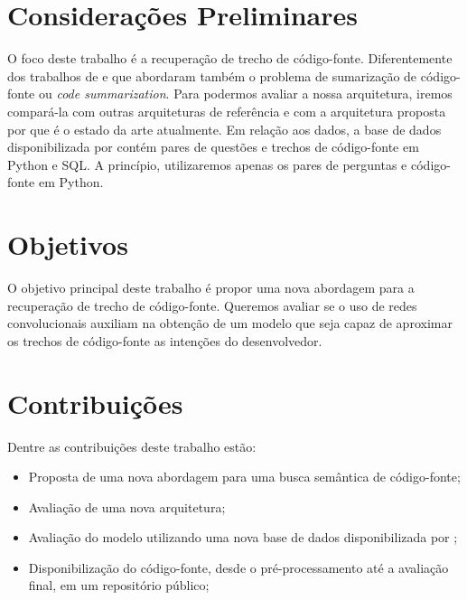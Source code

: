 \section{Considerações Preliminares}
\label{sec:consideracoes_preliminares}

O foco deste trabalho é a recuperação de trecho de código-fonte. Diferentemente dos trabalhos de \cite{iyer-etal-2016-summarizing} e \cite{Allamanis-bimodal-source-code-natural-language:2015} que abordaram também o problema de sumarização de código-fonte ou \textit{code summarization}. Para podermos avaliar a nossa arquitetura, iremos compará-la com outras arquiteturas de referência e com a arquitetura proposta por \cite{cambronero-deep-learning-code-search:2019} que é o estado da arte atualmente. Em relação aos dados, a base de dados disponibilizada por \cite{yao-2018} contém pares de questões e trechos de código-fonte em Python e SQL. A princípio, utilizaremos apenas os pares de perguntas e código-fonte em Python.


\section{Objetivos}
\label{sec:objetivo}

O objetivo principal deste trabalho é propor uma nova abordagem para a recuperação de trecho de código-fonte. Queremos avaliar se o uso de redes convolucionais auxiliam na obtenção de um modelo que seja capaz de aproximar os trechos de código-fonte as intenções do desenvolvedor. 

\section{Contribuições}
\label{sec:contribucoes}

Dentre as contribuições deste trabalho estão:

\begin{itemize}
\item Proposta de uma nova abordagem para uma busca semântica de código-fonte;
\item Avaliação de uma nova arquitetura;
\item Avaliação do modelo utilizando uma nova base de dados disponibilizada por \cite{yao-2018};
\item Disponibilização do código-fonte, desde o pré-processamento até a avaliação final, em um repositório público;
\end{itemize}

